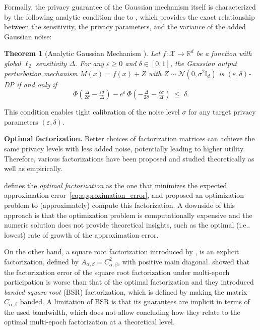 \documentclass{article} %
\makeatletter
\newtheorem{theorem}{Theorem}
\DeclareRobustCommand\onedot{\futurelet\@let@token\@onedot}
\def\@onedot{\ifx\@let@token.\else.\null\fi\xspace}
\def\ie{{i.e}\onedot} \def\Ie{{I.e}\onedot}
\makeatother
\begin{document}
Formally, the privacy guarantee of the Gaussian mechanism itself is characterized 
by the following analytic condition due to \citet{balle2018improving}, which provides the exact 
relationship between the sensitivity, the privacy parameters, and the variance 
of the added Gaussian noise:

\begin{theorem}[Analytic Gaussian Mechanism {\citep{balle2018improving}}]
Let $f : \mathcal{X} \to \mathbb{R}^d$ be a function with global $\ell_2$ sensitivity $\Delta$. 
For any $\varepsilon \geq 0$ and $\delta \in [0,1]$, the Gaussian output perturbation mechanism
$M(x) = f(x) + Z$ {with} $Z \sim \mathcal{N}(0, \sigma^2 \mathbb I_d)$ 
is $(\varepsilon, \delta)$-DP if and only if
\begin{equation*}
\Phi\!\left(\tfrac{\Delta}{2\sigma} - \tfrac{\varepsilon\sigma}{\Delta}\right) 
- e^{\varepsilon} \, \Phi\!\left(-\tfrac{\Delta}{2\sigma} - \tfrac{\varepsilon\sigma}{\Delta}\right) 
\;\leq\; \delta .
\end{equation*}
\end{theorem}

This condition enables tight calibration of the noise level $\sigma$ for any target 
privacy parameters $(\varepsilon,\delta)$. 

\textbf{Optimal factorization.} 
%
Better choices of factorization matrices can achieve the same privacy levels with less added noise, 
potentially leading to higher utility. 
%
Therefore, various factorizations have been proposed and studied theoretically as well as empirically. 
%

\citet{choquette2023amplified} defines the \emph{optimal factorization} as the one that 
minimizes the expected approximation error~\eqref{eq:approximation_error},
and proposed an optimization problem to (approximately) compute this factorization. 
%
A downside of this approach is that the optimization problem is computationally expensive 
and the numeric solution does not provide theoretical insights, such as the optimal 
(\ie lowest) rate of growth of the approximation error. 

On the other hand, a square root factorization introduced by \citet{Henzinger}, is an explicit factorization, defined by $A_{\alpha, \beta} = C_{\alpha, \beta}^2$, with positive main diagonal.
%
\citet{kalinin2024} showed that the factorization error of the square root factorization under 
multi-epoch participation is worse than that of the optimal factorization and they introduced 
{\em banded square root} (BSR) factorization, which is defined by making the matrix $C_{\alpha, \beta}$ banded. 
%
A limitation of BSR is that its guarantees are implicit in terms of the used bandwidth, which does not allow concluding how they relate to the optimal multi-epoch factorization at a theoretical level. 
\end{document}
